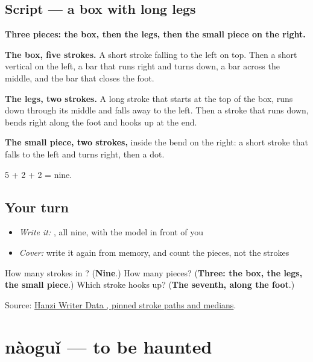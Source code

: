 \subsection*{Script — a box with long legs}

\begin{quote}
\end{quote}

\textbf{Three pieces: the box, then the legs, then the small piece on the right.}

\textbf{The box, five strokes.} A short stroke falling to the left on top. Then a short vertical on the left, a bar that runs right and turns down, a bar across the middle, and the bar that closes the foot.

\textbf{The legs, two strokes.} A long stroke that starts at the top of the box, runs down through its middle and falls away to the left. Then a stroke that runs down, bends right along the foot and hooks up at the end.

\textbf{The small piece, two strokes,} inside the bend on the right: a short stroke that falls to the left and turns right, then a dot.

5 + 2 + 2 = nine.

\subsection*{Your turn}
\begin{itemize}
\raggedright
  \item \emph{Write it:} , all nine, with the model in front of you
  \item \emph{Cover:} write it again from memory, and count the pieces, not the strokes
\end{itemize}

\begin{tcolorbox}[breakable,colback=teal!4,colframe=teal!35!black,title={Before you move on}]
How many strokes in ? (\textbf{Nine}.) How many pieces? (\textbf{Three: the box, the legs, the small piece}.) Which stroke hooks up? (\textbf{The seventh, along the foot}.)

Source: \href{https://raw.githubusercontent.com/chanind/hanzi-writer-data/68d10a4b21150cae5e1ebbd223eed289cf32d90c/data/\%E9\%AC\%BC.json}{Hanzi Writer Data , pinned stroke paths and medians}.
\end{tcolorbox}
\section[nàoguǐ]{nàoguǐ — to be haunted}

